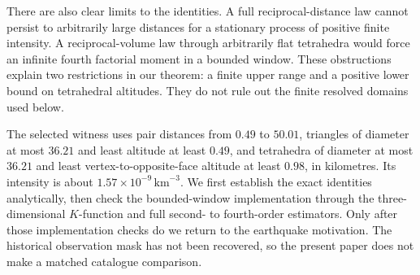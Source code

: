There are also clear limits to the identities. A full reciprocal-distance law cannot persist to arbitrarily large distances for a stationary process of positive finite intensity. A reciprocal-volume law through arbitrarily flat tetrahedra would force an infinite fourth factorial moment in a bounded window. These obstructions explain two restrictions in our theorem: a finite upper range and a positive lower bound on tetrahedral altitudes. They do not rule out the finite resolved domains used below.

The selected witness uses pair distances from $0.49$ to $50.01$, triangles of diameter at most $36.21$ and least altitude at least $0.49$, and tetrahedra of diameter at most $36.21$ and least vertex-to-opposite-face altitude at least $0.98$, in kilometres. Its intensity is about $1.57\times10^{-9}\,\mathrm{km}^{-3}$. We first establish the exact identities analytically, then check the bounded-window implementation through the three-dimensional $K$-function and full second- to fourth-order estimators. Only after those implementation checks do we return to the earthquake motivation. The historical observation mask has not been recovered, so the present paper does not make a matched catalogue comparison.
